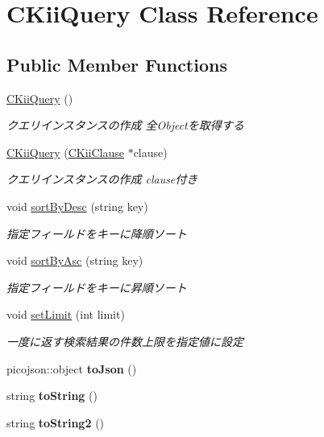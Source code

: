 \hypertarget{class_c_kii_query}{\section{C\-Kii\-Query Class Reference}
\label{class_c_kii_query}
}
\subsection*{Public Member Functions}
\begin{DoxyCompactItemize}
\item 
\hyperlink{class_c_kii_query_a0737372fcf004587373187ca68542896}{C\-Kii\-Query} ()
\begin{DoxyCompactList}\small\item\em クエリインスタンスの作成 全\-Objectを取得する \end{DoxyCompactList}\item 
\hyperlink{class_c_kii_query_af8c785977498347d465270e832a6c893}{C\-Kii\-Query} (\hyperlink{class_c_kii_clause}{C\-Kii\-Clause} $\ast$clause)
\begin{DoxyCompactList}\small\item\em クエリインスタンスの作成 clause付き \end{DoxyCompactList}\item 
void \hyperlink{class_c_kii_query_a9c12f9a838e8ef8be9b9e63b9116e141}{sort\-By\-Desc} (string key)
\begin{DoxyCompactList}\small\item\em 指定フィールドをキーに降順ソート \end{DoxyCompactList}\item 
void \hyperlink{class_c_kii_query_aa6d34fc6bf6151bdd644eb19eceb1431}{sort\-By\-Asc} (string key)
\begin{DoxyCompactList}\small\item\em 指定フィールドをキーに昇順ソート \end{DoxyCompactList}\item 
void \hyperlink{class_c_kii_query_ac32a445dba5a48478ee9a8b920d732d3}{set\-Limit} (int limit)
\begin{DoxyCompactList}\small\item\em 一度に返す検索結果の件数上限を指定値に設定 \end{DoxyCompactList}\item 
\hypertarget{class_c_kii_query_ac53af6cfaed9bbdc0a2a3d414bf358f2}{picojson\-::object {\bfseries to\-Json} ()}\label{class_c_kii_query_ac53af6cfaed9bbdc0a2a3d414bf358f2}

\item 
\hypertarget{class_c_kii_query_a85be0a2eacc137eb41146af41c62b285}{string {\bfseries to\-String} ()}\label{class_c_kii_query_a85be0a2eacc137eb41146af41c62b285}

\item 
\hypertarget{class_c_kii_query_a6f6a93872c1b27a46808aa4150758d83}{string {\bfseries to\-String2} ()}\label{class_c_kii_query_a6f6a93872c1b27a46808aa4150758d83}

\end{DoxyCompactItemize}
